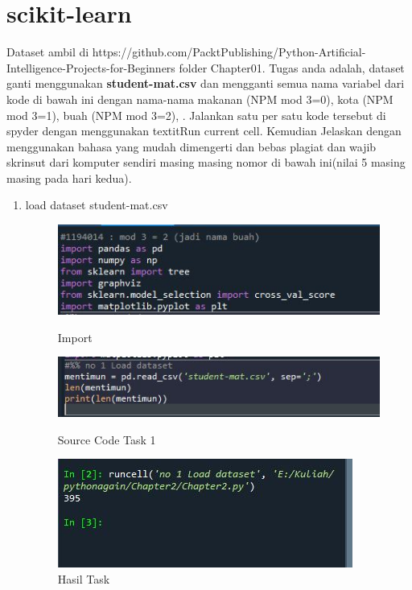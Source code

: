 \section{scikit-learn}
Dataset ambil di https://github.com/PacktPublishing/Python-Artificial-Intelligence-Projects-for-Beginners folder Chapter01.
Tugas anda adalah, dataset ganti menggunakan \textbf{student-mat.csv} dan mengganti semua nama variabel dari kode di bawah ini dengan nama-nama makanan (NPM mod 3=0), kota (NPM mod 3=1), buah (NPM mod 3=2), . Jalankan satu per satu kode tersebut di spyder dengan menggunakan textit{Run current cell}. Kemudian Jelaskan dengan menggunakan bahasa yang mudah dimengerti dan bebas plagiat dan wajib skrinsut dari komputer sendiri masing masing nomor di bawah ini(nilai 5 masing masing pada hari kedua).

\begin{enumerate}

\item load dataset student-mat.csv
\begin{figure}[!htbp]
    \centering
    \includegraphics[scale=0.5]{figures/importchap2.JPG}
	\caption{Import}
    \includegraphics[scale=0.5]{figures/Chap2-1.JPG}
	\caption{Source Code Task 1}
    \includegraphics[scale=0.5]{figures/Chap2-1.1.JPG}
	\caption{Hasil Task}
\end{figure}


\end{enumerate}

